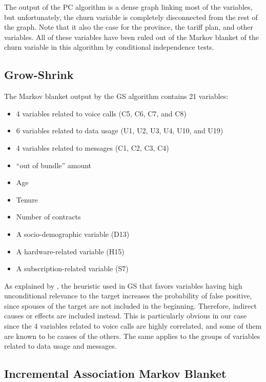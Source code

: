 The output of the PC algorithm is a dense graph linking most of the variables,
but unfortunately, the churn variable is completely disconnected from the rest
of the graph. Note that it also the case for the province, the tariff plan, and
other variables. All of these variables have been ruled out of the Markov
blanket of the churn variable in this algorithm by conditional independence
tests.

\subsection{Grow-Shrink}

The Markov blanket output by the GS algorithm contains 21 variables:

\begin{itemize}
    \item 4 variables related to voice calls (C5, C6, C7, and C8)
    \item 6 variables related to data usage (U1, U2, U3, U4, U10, and U19)
    \item 4 variables related to messages (C1, C2, C3, C4)
    \item ``out of bundle'' amount
    \item Age
    \item Tenure
    \item Number of contracts
    \item A socio-demographic variable (D13)
    \item A hardware-related variable (H15)
    \item A subscription-related variable (S7)
\end{itemize}

As explained by \textcite{tsamardinos2003algorithms}, the heuristic used in GS
that favors variables having high unconditional relevance to the target
increases the probability of false positive, since spouses of the target are not
included in the beginning. Therefore, indirect causes or effects are included
instead. This is particularly obvious in our case since the 4 variables related
to voice calls are highly correlated, and some of them are known to be causes of
the others. The same applies to the groups of variables related to data usage and
messages.

\subsection{Incremental Association Markov Blanket}

